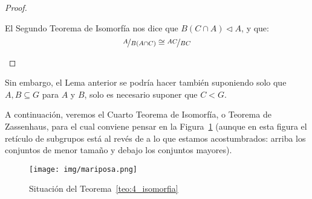 \begin{lema}
\begin{proof}
\begin{enumerate}
\begin{figure}[H]
                \end{figure}
                El Segundo Teorema de Isomorfía nos dice que $B(C\cap A)\lhd A$, y que:
                \begin{equation*}
                    \nicefrac{A}{B(A\cap C)} \cong \nicefrac{AC}{BC}
                \end{equation*}
        \end{enumerate}
    \end{proof}
\end{lema}

\begin{observacion}
    Sin embargo, el Lema anterior se podría hacer también suponiendo solo que $A,B\subseteq G$ para $A$ y $B$, solo es necesario suponer que $C<G$.
\end{observacion}

\noindent
A continuación, veremos el Cuarto Teorema de Isomorfía, o Teorema de Zassenhaus, para el cual conviene pensar en la Figura~\ref{fig:4_isomorfia} (aunque en esta figura el retículo de subgrupos está al revés de a lo que estamos acostumbrados: arriba los conjuntos de menor tamaño y debajo los conjuntos mayores).

\begin{figure}[H]
    \centering
    \texttt{[image: img/mariposa.png]}
    \caption{Situación del Teorema~\ref{teo:4_isomorfia}}
    \label{fig:4_isomorfia}
\end{figure}

